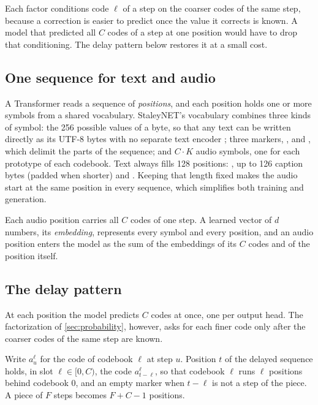 Each factor conditions code $\ell$ of a step on the coarser codes of the same
step, because a correction is easier to predict once the value it corrects is
known. A model that predicted all $C$ codes of a step at one position would
have to drop that conditioning. The delay pattern below restores it at a
small cost.

\subsection{One sequence for text and audio}

A Transformer reads a sequence of \emph{positions}, and each position holds
one or more symbols from a shared vocabulary. StaleyNET's vocabulary combines
three kinds of symbol: the 256 possible values of a byte, so that any text can
be written directly as its UTF-8 bytes with no separate text encoder
\cite{xue2022byt5}; three markers, ,  and
, which delimit the parts of the sequence; and $C \cdot K$ audio
symbols, one for each prototype of each codebook. Text always fills 128
positions: , up to 126 caption bytes (padded when shorter) and
. Keeping that length fixed makes the audio start at the same
position in every sequence, which simplifies both training and generation.

Each audio position carries all $C$ codes of one step. A learned vector of $d$
numbers, its \emph{embedding}, represents every symbol and every position, and
an audio position enters the model as the sum of the embeddings of its $C$
codes and of the position itself.

\subsection{The delay pattern}

At each position the model predicts $C$ codes at once, one per output head.
The factorization of \cref{sec:probability}, however, asks for each finer code
only after the coarser codes of the same step are known.

\begin{definition}
Write $a_{u}^{\ell}$ for the code of codebook $\ell$ at step $u$. Position $t$ of
the delayed sequence holds, in slot $\ell \in [0, C)$, the code
$a_{t-\ell}^{\ell}$, so that codebook $\ell$ runs $\ell$ positions behind codebook
0, and an empty marker when $t - \ell$ is not a step of the piece. A piece of
$F$ steps becomes $F + C - 1$ positions.
\end{definition}

